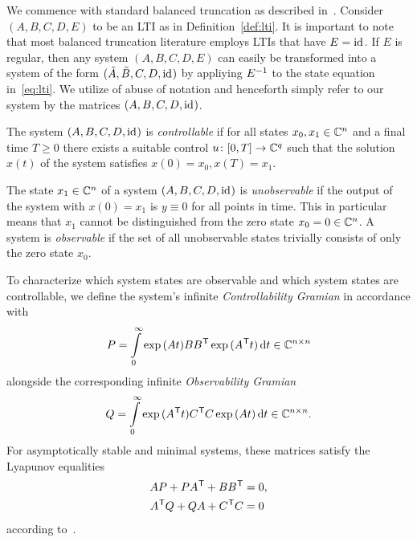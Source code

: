 We commence with standard balanced truncation as described in~\cite{BB2017}.
Consider $(A, B, C, D, E)$ to be an \ac{LTI} as in Definition~\ref{def:lti}.
It is important to note that most balanced truncation literature employs \acp{LTI} that have $E = \text{id}_{}$.
If $E$ is regular, then any system $(A, B, C, D, E)$ can easily be transformed into a system of the form $(\tilde{A}, \tilde{B}, C, D, \text{id}_{})$ by appliying $E^{-1}$ to the state equation in~\eqref{eq:lti}.
We utilize of abuse of notation and henceforth simply refer to our system by the matrices $(A, B, C, D, \text{id}_{})$.

\begin{definition}[{Cf.~\cite[Definition~6.2]{BB2017}}]\label{def:controllability}
    The system $(A, B, C, D, \text{id}_{})$ is \emph{controllable} if for all states $x_0, x_1 \in \mathbb{C}^n$ and a final time $T \geq 0$ there exists a suitable control $u \colon \interval{0}{T} \to \bb{C}^q$ such that the solution $x(t)$ of the system satisfies $x(0) = x_0, x(T) = x_1$.
\end{definition}

\begin{definition}[{Cf.~\cite[Definition~6.3]{BB2017}}]\label{def:observability}
    The state $x_1 \in \mathbb{C}^n$ of a system $(A, B, C, D, \text{id}_{})$ is \emph{unobservable} if the output of the system with $x(0) = x_1$ is $y \equiv 0$ for all points in time.
    This in particular means that $x_1$ cannot be distinguished from the zero state $x_0 = 0 \in \mathbb{C}^n$.
    A system is \emph{observable} if the set of all unobservable states trivially consists of only the zero state $x_0$.
\end{definition}

To characterize which system states are observable and which system states are controllable, we define the system's infinite \emph{Controllability Gramian} in accordance with~\cite[Equation~6.8]{BB2017}
\begin{equation}\label{eq:controllability-gramian}
    P = \int\limits_0^\infty \exp{(A t)} B B^{\mkern1mu \mathsf{T}} \exp{(A^{\mkern1mu \mathsf{T}}t)} \mathop{}\!\mathrm{d} t \in \mathbb{C}^{n \times n}
\end{equation}
alongside the corresponding infinite \emph{Observability Gramian}
\begin{equation}\label{eq:observability-gramian}
    Q = \int\limits_0^\infty \exp{(A^{\mkern1mu \mathsf{T}}t)} C^{\mkern1mu \mathsf{T}} C \exp{(A t)} \mathop{}\!\mathrm{d} t \in \mathbb{C}^{n \times n}.
\end{equation}
For asymptotically stable and minimal systems, these matrices satisfy the Lyapunov equalities
\begin{equation}\label{eq:lyapunov-equations}
    \begin{aligned}
        A P + P A^{\mkern1mu \mathsf{T}} + B B^{\mkern1mu \mathsf{T}} &= 0, \\
        A^{\mkern1mu \mathsf{T}} Q + Q A + C^{\mkern1mu \mathsf{T}} C &= 0
    \end{aligned}
\end{equation}
according to~\cite{Antoulas2005, Hinrichsen2005}.

